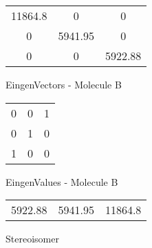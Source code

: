 \begin{multicols}{2}
\begin{center}
\begin{tabular}{|c c c|}
11864.8	 & 	0	 & 	0	 \\
0	 & 	5941.95	 & 	0	 \\
0	 & 	0	 & 	5922.88
\end{tabular}

\vtab
 EingenVectors - Molecule B     \\
\vtab
\begin{tabular}{|c c c|}
0	 & 	0	 & 	1	 \\
0	 & 	1	 & 	0	 \\
1	 & 	0	 & 	0
\end{tabular}

\vtab
 EingenValues - Molecule B     \\
\vtab
\begin{tabular}{|c c c|}
5922.88	 & 	5941.95	 & 	11864.8	 \\
\end{tabular}

\end{center}
\end{multicols}
\begin{center}
\vtab
\vtab
\textcolor{NavyBlue}{\Large Stereoisomer}
\end{center}

 \newpage

